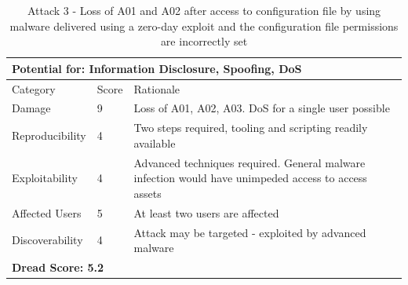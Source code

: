 \documentclass [11pt, proquest] {uwthesis}[2020/02/24]
\begin{document}
\begin{table}[H]
\label{attack3-ref}
\begin{tabular}{|m{3cm}|m{.9cm}|p{27em} |}
\multicolumn{3}{l}{Potential for: Information Disclosure, Spoofing, DoS}                   \\
\hline
Category & Score & Rationale \\
\hline
Damage          & 9     & Loss of A01, A02, A03. DoS for a single user possible            \\
\hline
Reproducibility & 4     & Two steps required, tooling and scripting readily available    \\
\hline
Exploitability & 4      & Advanced techniques required. General malware infection would have unimpeded access to access assets  \\
\hline
Affected Users  & 5     & At least two users are affected                      \\
\hline
Discoverability & 4     & Attack may be targeted - exploited by advanced malware \\
\hline
\multicolumn{3}{l}{\textbf{Dread Score: 5.2}} 
\end{tabular}
\caption{Attack 3 - Loss of A01 and A02 after access to configuration file by using malware delivered using a zero-day exploit and the configuration file permissions are incorrectly set}
\end{table}
\end{document}
